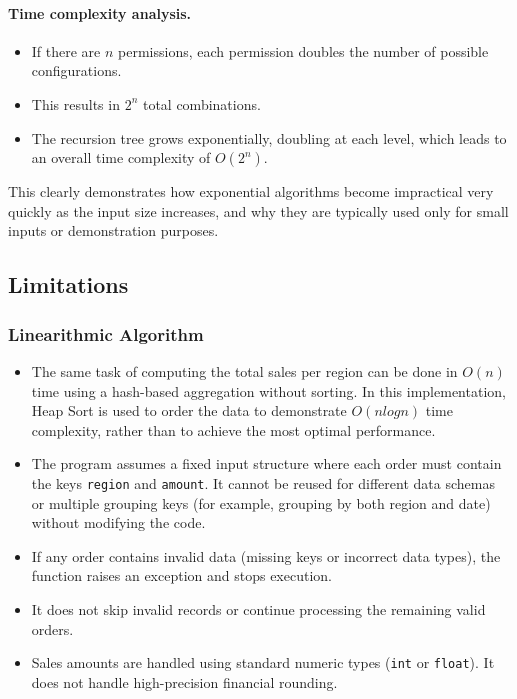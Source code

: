 \documentclass[12pt]{article}
\begin{document}
\paragraph{Time complexity analysis.}

\begin{itemize}
	\item If there are $n$ permissions, each permission doubles the number of possible configurations.
	\item This results in $2^n$ total combinations.
	\item The recursion tree grows exponentially, doubling at each level, which leads to an overall time complexity of $O(2^n)$.
\end{itemize}

\noindent This clearly demonstrates how exponential algorithms become impractical very quickly
as the input size increases, and why they are typically used only for small inputs or
demonstration purposes.

\subsection{Limitations}

\subsubsection{Linearithmic Algorithm}
\begin{itemize}
	\item The same task of computing the total sales per region can be done in $O(n)$ time using a hash-based aggregation without sorting. In this implementation, Heap Sort is used to order the data to demonstrate $O(n log n)$ time complexity, rather than to achieve the most optimal performance.
	\item The program assumes a fixed input structure where each order must contain the keys
	      \texttt{region} and \texttt{amount}. It cannot be reused for different data schemas or multiple grouping
	      keys (for example, grouping by both region and date) without modifying the code.
	\item If any order contains invalid data (missing keys or incorrect data types), the function raises an
	      exception and stops execution.
	\item It does not skip invalid records or continue processing the remaining valid orders.
	\item Sales amounts are handled using standard numeric types (\texttt{int} or \texttt{float}). It does not
	      handle high-precision financial rounding.
\end{itemize}
\end{document}
